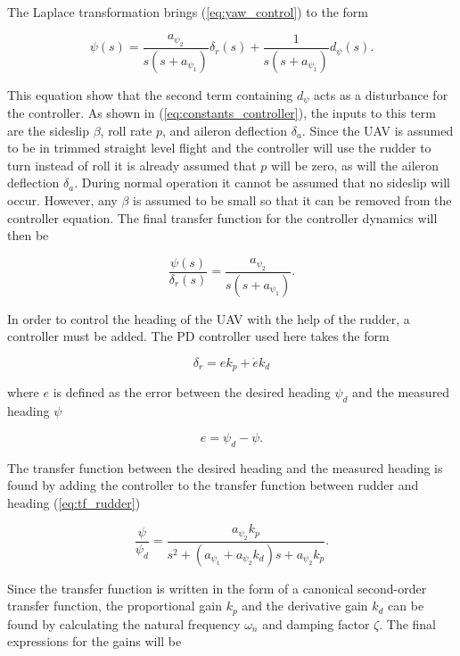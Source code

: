 The Laplace transformation brings (\ref{eq:yaw_control}) to the form

\begin{equation}
	\label{eq:yaw_controller_s}
	\psi(s) = \frac{a_{\psi_2}}{s(s+a_{\psi_1})}\delta_r(s) + \frac{1}{s(s+a_{\psi_1})}d_\psi(s).
\end{equation}

This equation show that the second term containing $d_\psi$ acts as a disturbance for the controller. As shown in (\ref{eq:constants_controller}), the inputs to this term are the sideslip $\beta$, roll rate $p$, and aileron deflection $\delta_a$. Since the UAV is assumed to be in trimmed straight level flight and the controller will use the rudder to turn instead of roll it is already assumed that $p$ will be zero, as will the aileron deflection $\delta_a$. During normal operation it cannot be assumed that no sideslip will occur. However, any $\beta$ is assumed to be small so that it can be removed from the controller equation. The final transfer function for the controller dynamics will then be

\begin{equation}
	\label{eq:tf_rudder}
	\frac{\psi(s)}{\delta_r(s)} = \frac{a_{\psi_2}}{s(s+a_{\psi_1})}.
\end{equation}

In order to control the heading of the UAV with the help of the rudder, a controller must be added. The PD controller used here takes the form

\begin{equation}
	\delta_r = ek_p + \dot{e}k_d
\end{equation}

where $e$ is defined as the error between the desired heading $\psi_d$ and the measured heading $\psi$

\begin{equation}
	e = \psi_d - \psi.
\end{equation}

The transfer function between the desired heading and the measured heading is found by adding the controller to the transfer function between rudder and heading (\ref{eq:tf_rudder})

\begin{equation}
	\label{eq:rudder_PD}
	\frac{\psi}{\psi_d} = \frac{a_{\psi_2}k_p}{s^2 + (a_{\psi_1}+a_{\psi_2}k_d)s + a_{\psi_2}k_p}.
\end{equation}

Since the transfer function is written in the form of a canonical second-order transfer function, the proportional gain $k_p$ and the derivative gain $k_d$ can be found by calculating the natural frequency $\omega_n$ and damping factor $\zeta$. The final expressions for the gains will be

